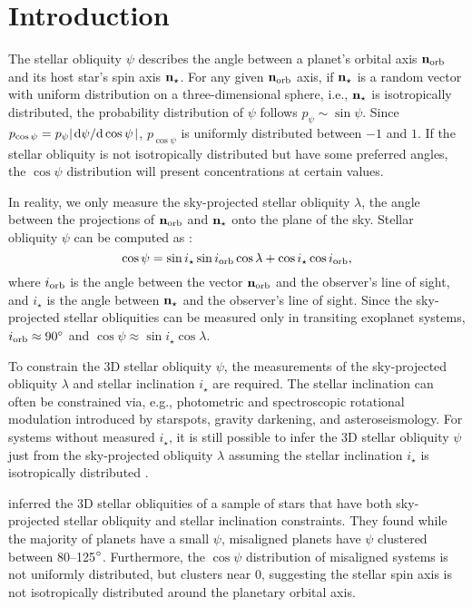 \documentclass[twocolumn,times]{aastex631}
\begin{document}
\section{Introduction}
\label{sec:intro}

The stellar obliquity $\psi$ describes the angle between a planet's orbital axis $\bf{n}_{\rm orb}$ and its host star's spin axis $\bf{n}_{\star}$.
For any given $\bf{n}_{\rm orb}$ axis, if $\bf{n}_{\star}$ is a random vector with uniform distribution on a three-dimensional sphere, i.e., $\bf{n}_{\star}$ is isotropically distributed, the probability distribution of $\psi$ follows $p_{\psi} \sim \sin{\psi}$. Since $p_{\cos{\psi}} = p_{\psi} \abs{\dv*{\psi}{\cos{\psi}}}$, $p_{\cos{\psi}}$ is uniformly distributed between $-1$ and $1$. If the stellar obliquity is not isotropically distributed but have some preferred angles, the $\cos{\psi}$ distribution will present concentrations at certain values.

In reality, we only measure the sky-projected stellar obliquity $\lambda$, the angle between the projections of $\bf{n}_{\rm orb}$ and $\bf{n}_{\star}$ onto the plane of the sky. Stellar obliquity $\psi$ can be computed as \citep[e.g.,][]{Fabrycky09}:
\begin{equation}\label{eqn:psi}
    \cos{\psi} = \sin{i_\star}\sin{i_{\rm orb}}\cos{\lambda} + \cos{i_\star}\cos{i_{\rm orb}},
\end{equation}
where $i_{\rm orb}$ is the angle between the vector $\bf{n}_{\rm orb}$ and the observer's line of sight, and $i_\star$ is the angle between $\bf{n}_{\star}$ and the observer's line of sight.
Since the sky-projected stellar obliquities can be measured only in transiting exoplanet systems, $i_{\rm orb} \approx 90\mbox{$^\circ$}$ and $\cos{\psi} \approx \sin{i_\star}\cos{\lambda}$.

To constrain the 3D stellar obliquity $\psi$, the measurements of the sky-projected obliquity $\lambda$ and stellar inclination $i_\star$ are required. The stellar inclination can often be constrained via, e.g., photometric and spectroscopic rotational modulation introduced by starspots, gravity darkening, and asteroseismology. For systems without measured $i_\star$, it is still possible to infer the 3D stellar obliquity $\psi$ just from the sky-projected obliquity $\lambda$ assuming the stellar inclination $i_\star$ is isotropically distributed \citep[e.g.,][]{Fabrycky09}.

\cite{Albrecht21} inferred the 3D stellar obliquities of a sample of stars that have both sky-projected stellar obliquity and stellar inclination constraints. They found while the majority of planets have a small $\psi$, misaligned planets have $\psi$ clustered between 80--125$\mbox{$^\circ$}$. Furthermore, the $\cos{\psi}$ distribution of misaligned systems is not uniformly distributed, but clusters near 0, suggesting the stellar spin axis is not isotropically distributed around the planetary orbital axis.
\end{document}
